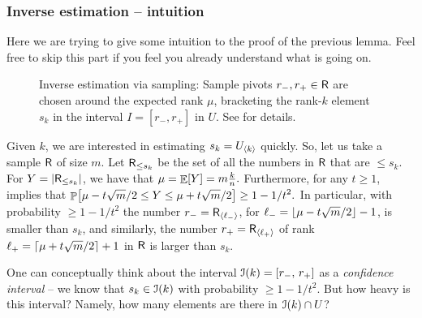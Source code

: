 \subsubsection{Inverse estimation -- intuition}

Here we are trying to give some intuition to the proof of the previous
lemma. Feel free to skip this part if you feel you already understand
what is going on.

\begin{figure}[t]
    \centering
    \caption{Inverse estimation via sampling: Sample pivots $r_-,
      r_+ \in \mathsf{R}$ are chosen around the expected rank $\mu$,
      bracketing the rank-$k$ element $s_k$ in the interval $I = [r_-,
      r_+]$ in $U$. See  for details.}
\end{figure}


Given $k$, we are interested in estimating $s_k = U_{\langle k\rangle}$
quickly. So, let us take a sample $\mathsf{R}$ of size $m$. Let
$\mathsf{R}_{\leq s_k}$ be the set of all the numbers in $\mathsf{R}$ that
are $\leq s_k$. For $Y = \left| {\mathsf{R}_{\leq s_k}} \right|$, we have that
\begin{math}
  \mu = \mathop{\mathbb{E}}\!\left[ {Y} \right] = m \frac{k}{n}.
\end{math}
Furthermore, for any $t\geq 1$,  implies
that
\begin{math}
    \ds%
    \Prob{ \mu - t \sqrt{m}/2 \leq Y \leq \mu + t \sqrt{m}/2 } \geq 1-
    {1}/{t^2}.
\end{math}
In particular, with probability $\geq 1- 1/t^2$ the number
$r_{-} =\mathsf{R}_{\langle\ell_-\rangle}$, for
$\ell_{-} = \left\lfloor {\mu - t \sqrt{m}/2 } \right\rfloor-1$, is smaller than $s_k$, and
similarly, the number $r_{+} = \mathsf{R}_{\langle\ell_{+}\rangle}$ of rank
$\ell_{+} = \left\lceil {\mu + t \sqrt{m}/2 } \right\rceil+1$ in $\mathsf{R}$ is larger than
$s_k$.

One can conceptually think about the interval
\begin{math}
    \Interval(k) = [r_-,\, r_+ ]%
\end{math}
as a \emph{confidence interval} -- we know that $s_k \in \EuScript{I}(k)$
with probability $\geq 1-1/t^2$. But how heavy is this interval?
Namely, how many elements are there in $\EuScript{I}(k) \cap U$?

